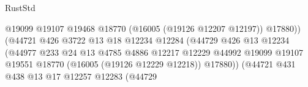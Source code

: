 \begin{lexlean}{RustStd}
\begin{coremodule}
                                                          @19099
                                                          @19107
                                                          @19468
                                                          @18770
                                                          (@16005 (@19126 @12207 @12197))
                                                          @17880))
                                                      (@44721
                                                        @426
                                                        @3722
                                                        @13
                                                        @18
                                                        @12234
                                                        @12284
                                                        (@44729
                                                          @426
                                                          @13
                                                          @12234
                                                          (@44977
                                                            @233
                                                            @24
                                                            @13
                                                            @4785
                                                            @4886
                                                            @12217
                                                            @12229
                                                            @44992
                                                            @19099
                                                            @19107
                                                            @19551
                                                            @18770
                                                            (@16005 (@19126 @12229 @12218))
                                                            @17880))
                                                        (@44721
                                                          @431
                                                          @438
                                                          @13
                                                          @17
                                                          @12257
                                                          @12283
                                                          (@44729

\end{coremodule}
\end{lexlean}

